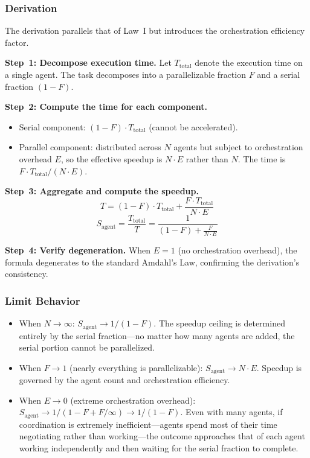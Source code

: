 \documentclass[11pt,a4paper]{article}
\begin{document}
\subsubsection{Derivation}

The derivation parallels that of Law~I but introduces the orchestration efficiency factor.

\textbf{Step~1: Decompose execution time.}
Let $T_{\mathrm{total}}$ denote the execution time on a single agent. The task decomposes into a parallelizable fraction $F$ and a serial fraction $(1-F)$.

\textbf{Step~2: Compute the time for each component.}
\begin{itemize}[nosep]
\item Serial component: $(1-F) \cdot T_{\mathrm{total}}$ (cannot be accelerated).
\item Parallel component: distributed across $N$ agents but subject to orchestration overhead $E$, so the effective speedup is $N \cdot E$ rather than $N$. The time is $F \cdot T_{\mathrm{total}} / (N \cdot E)$.
\end{itemize}

\textbf{Step~3: Aggregate and compute the speedup.}
\begin{equation}
T = (1-F) \cdot T_{\mathrm{total}} + \frac{F \cdot T_{\mathrm{total}}}{N \cdot E}
\end{equation}
\begin{equation}
S_{\mathrm{agent}} = \frac{T_{\mathrm{total}}}{T} = \frac{1}{(1-F) + \frac{F}{N \cdot E}}
\end{equation}

\textbf{Step~4: Verify degeneration.} When $E = 1$ (no orchestration overhead), the formula degenerates to the standard Amdahl's Law, confirming the derivation's consistency.

\subsubsection{Limit Behavior}

\begin{itemize}[nosep]
\item When $N \to \infty$: $S_{\mathrm{agent}} \to 1/(1-F)$. The speedup ceiling is determined entirely by the serial fraction---no matter how many agents are added, the serial portion cannot be parallelized.

\item When $F \to 1$ (nearly everything is parallelizable): $S_{\mathrm{agent}} \to N \cdot E$. Speedup is governed by the agent count and orchestration efficiency.

\item When $E \to 0$ (extreme orchestration overhead): $S_{\mathrm{agent}} \to 1/(1-F + F/\infty) \to 1/(1-F)$. Even with many agents, if coordination is extremely inefficient---agents spend most of their time negotiating rather than working---the outcome approaches that of each agent working independently and then waiting for the serial fraction to complete.
\end{itemize}
\end{document}

